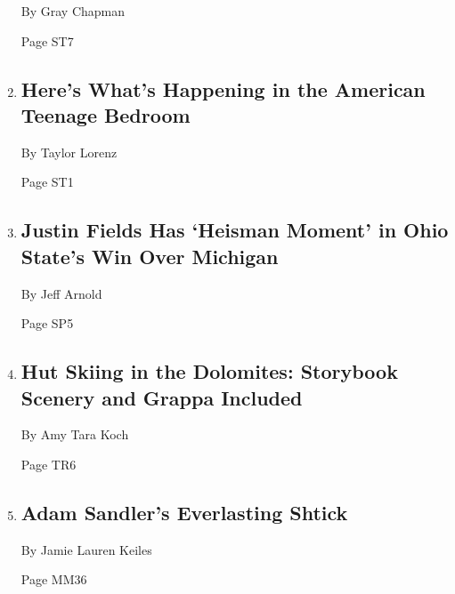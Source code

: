 \begin{enumerate}
  By Gray Chapman

  Page ST7
\item
  \href{/2019/11/29/style/the-clout.html}{}

  \hypertarget{heres-whats-happening-in-the-american-teenage-bedroom}{%
  \subsection{Here's What's Happening in the American Teenage
  Bedroom}\label{heres-whats-happening-in-the-american-teenage-bedroom}}

  By Taylor Lorenz

  Page ST1
\item
  \href{/2019/11/30/sports/ncaafootball/ohio-state-michigan-justin-fields.html}{}

  \hypertarget{justin-fields-has-heisman-moment-in-ohio-states-win-over-michigan}{%
  \subsection{Justin Fields Has `Heisman Moment' in Ohio State's Win
  Over
  Michigan}\label{justin-fields-has-heisman-moment-in-ohio-states-win-over-michigan}}

  By Jeff Arnold

  Page SP5
\item
  \href{/2019/11/25/travel/ski-safari-dolomites-italian-alps-rifugios.html}{}

  \hypertarget{hut-skiing-in-the-dolomites-storybook-scenery-and-grappa-included}{%
  \subsection{Hut Skiing in the Dolomites: Storybook Scenery and Grappa
  Included}\label{hut-skiing-in-the-dolomites-storybook-scenery-and-grappa-included}}

  By Amy Tara Koch

  Page TR6
\item
  \href{/2019/11/27/magazine/adam-sandler-movies-uncut-gems.html}{}

  \hypertarget{adam-sandlers-everlasting-shtick}{%
  \subsection{Adam Sandler's Everlasting
  Shtick}\label{adam-sandlers-everlasting-shtick}}

  By Jamie Lauren Keiles

  Page MM36
\end{enumerate}

